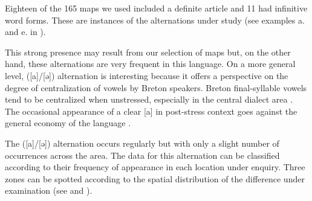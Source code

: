 \documentclass[output=paper]{LSP/langsci}
\begin{document}
\begin{table}
\caption{Phonetic contexts for the alternations ([a]/[ə])}
\label{tab:brun:5}
\end{table}

Eighteen of the 165 maps we used included a definite article and 11 had infinitive word forms. These are instances of the alternations under study (see examples a. and e. in ).

This strong presence may result from our selection of maps but, on the other hand, these alternations are very frequent in this language. On a more general level, ([a]/[ə]) alternation is interesting because it offers a perspective on the degree of centralization of vowels by Breton speakers. Breton final-syllable vowels tend to be centralized when unstressed, especially in the central dialect area \citep[8-10]{wmffre_central_1998}. The occasional appearance of a clear [a] in post-stress context goes against the general economy of the language \citep{martinet_economie_1955}.

The ([a]/[ə]) alternation occurs regularly but with only a slight number of occurrences across the area. The data for this alternation can be classified according to their frequency of appearance in each location under enquiry. Three zones can be spotted according to the spatial distribution of the difference under examination (see  and ).
\end{document}
